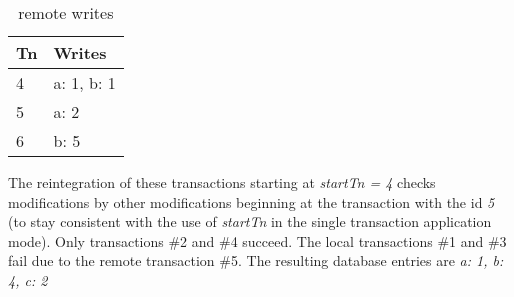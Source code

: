 \begin{table}[h]
\centering
\begin{tabular}{|ll|}
  \hline
  Tn & Writes \\ \hline
  4  & a: 1, b: 1 \\
  5  & a: 2 \\
  6  & b: 5 \\
  \hline
\end{tabular}
\caption{remote writes}
\label{tab:remote-writes}
\end{table}

The reintegration of these transactions starting at \emph{startTn = 4} checks
modifications by other modifications beginning at the transaction with the id
\emph{5} (to stay consistent with the use of \emph{startTn} in the single
transaction application mode). Only transactions \#2 and \#4 succeed. The local
transactions \#1 and \#3 fail due to the remote transaction \#5.  The resulting database entries are \emph{a: 1, b: 4, c: 2}
